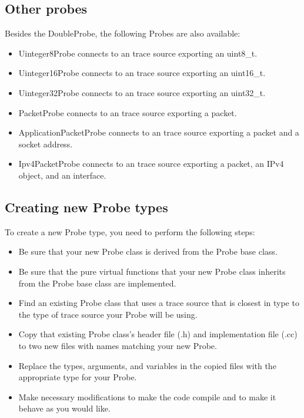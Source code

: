 \documentclass[letterpaper,10pt,english]{sphinxmanual}
\begin{document}
\subsection{Other probes}
\label{\detokenize{probe:other-probes}}
Besides the DoubleProbe, the following Probes are also available:
\begin{itemize}
\item {} 
Uinteger8Probe connects to an  trace source exporting an uint8\_t.

\item {} 
Uinteger16Probe connects to an  trace source exporting an uint16\_t.

\item {} 
Uinteger32Probe connects to an  trace source exporting an uint32\_t.

\item {} 
PacketProbe connects to an  trace source exporting a packet.

\item {} 
ApplicationPacketProbe connects to an  trace source exporting a packet and a socket address.

\item {} 
Ipv4PacketProbe connects to an  trace source exporting a packet, an IPv4 object, and an interface.

\end{itemize}


\subsection{Creating new Probe types}
\label{\detokenize{probe:creating-new-probe-types}}
To create a new Probe type, you need to perform the following steps:
\begin{itemize}
\item {} 
Be sure that your new Probe class is derived from the Probe base class.

\item {} 
Be sure that the pure virtual functions that your new Probe class
inherits from the Probe base class are implemented.

\item {} 
Find an existing Probe class that uses a trace source that is
closest in type to the type of trace source your Probe will be
using.

\item {} 
Copy that existing Probe class’s header file (.h) and implementation
file (.cc) to two new files with names matching your new Probe.

\item {} 
Replace the types, arguments, and variables in the copied files with
the appropriate type for your Probe.

\item {} 
Make necessary modifications to make the code compile and to make it
behave as you would like.

\end{itemize}
\end{document}
